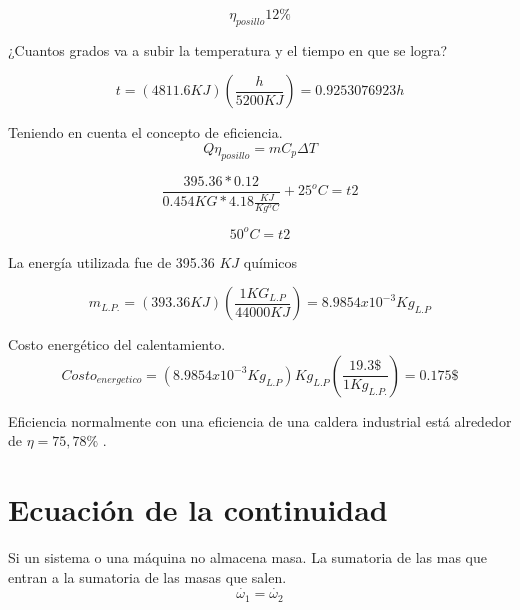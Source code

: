 \documentclass[]{article}
\begin{document}
\begin{equation}
\eta_{posillo} 12 \%
\end{equation}




¿Cuantos grados va a subir la temperatura y el tiempo en que se logra?


\begin{equation}
t=(4811.6KJ)(\frac{h}{5200KJ})=0.9253076923h
\end{equation}

Teniendo en cuenta el concepto de eficiencia.\\


\begin{equation}
Q \eta_{posillo} =mC_p\Delta T 
\end{equation}

\begin{equation}
\frac{395.36*0.12}{0.454KG*4.18\frac{KJ}{Kg^oC}}+25^oC=t2
\end{equation}


\begin{equation}
50^oC=t2
\end{equation}

La energía utilizada fue de 395.36 $KJ$ químicos

\begin{equation}
 m_{L.P.}=(393.36KJ)(\frac{1KG_{L.P}}{44000KJ})=8.9854x10^{-3}Kg_{L.P}
\end{equation}

Costo energético del calentamiento.\\

\begin{equation}
 Costo_{energetico}=(8.9854x10^{-3}Kg_{L.P})Kg_{L.P}(\frac{19.3\$}{1 Kg_{L.P.}})=0.175\$
\end{equation}



Eficiencia normalmente con una eficiencia de una caldera industrial está alrededor de $\eta=75,78 \%$ .\\


\section{Ecuación de la continuidad}

Si un sistema o una máquina no almacena masa. La sumatoria de las mas que entran a la sumatoria de las masas que salen.\\

\begin{equation}
  \dot{\omega_1}=\dot{\omega_2}
\end{equation}
\end{document}
